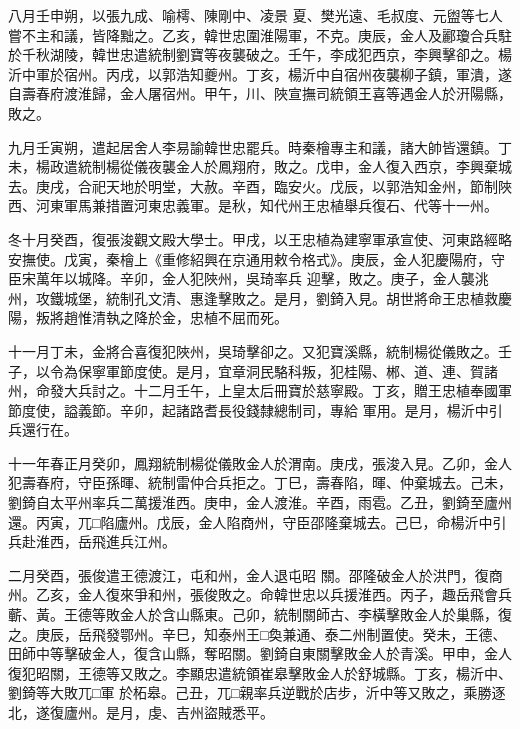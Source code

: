 \begin{pinyinscope}
 八月壬申朔，以張九成、喻樗、陳剛中、凌景
 夏、樊光遠、毛叔度、元盥等七人嘗不主和議，皆降黜之。乙亥，韓世忠圍淮陽軍，不克。庚辰，金人及酈瓊合兵駐於千秋湖陵，韓世忠遣統制劉寶等夜襲破之。壬午，李成犯西京，李興擊卻之。楊沂中軍於宿州。丙戌，以郭浩知夔州。丁亥，楊沂中自宿州夜襲柳子鎮，軍潰，遂自壽春府渡淮歸，金人屠宿州。甲午，川、陜宣撫司統領王喜等遇金人於汧陽縣，敗之。



 九月壬寅朔，遣起居舍人李易諭韓世忠罷兵。時秦檜專主和議，諸大帥皆還鎮。丁
 未，楊政遣統制楊從儀夜襲金人於鳳翔府，敗之。戊申，金人復入西京，李興棄城去。庚戌，合祀天地於明堂，大赦。辛酉，臨安火。戊辰，以郭浩知金州，節制陜西、河東軍馬兼措置河東忠義軍。是秋，知代州王忠植舉兵復石、代等十一州。



 冬十月癸酉，復張浚觀文殿大學士。甲戌，以王忠植為建寧軍承宣使、河東路經略安撫使。戊寅，秦檜上《重修紹興在京通用敕令格式》。庚辰，金人犯慶陽府，守臣宋萬年以城降。辛卯，金人犯陜州，吳琦率兵
 迎擊，敗之。庚子，金人襲洮州，攻鐵城堡，統制孔文清、惠逢擊敗之。是月，劉錡入見。胡世將命王忠植救慶陽，叛將趙惟清執之降於金，忠植不屈而死。



 十一月丁未，金將合喜復犯陜州，吳琦擊卻之。又犯寶溪縣，統制楊從儀敗之。壬子，以令為保寧軍節度使。是月，宜章洞民駱科叛，犯桂陽、郴、道、連、賀諸州，命發大兵討之。十二月壬午，上皇太后冊寶於慈寧殿。丁亥，贈王忠植奉國軍節度使，謚義節。辛卯，起諸路耆長役錢隸總制司，專給
 軍用。是月，楊沂中引兵還行在。



 十一年春正月癸卯，鳳翔統制楊從儀敗金人於渭南。庚戌，張浚入見。乙卯，金人犯壽春府，守臣孫暉、統制雷仲合兵拒之。丁巳，壽春陷，暉、仲棄城去。己未，劉錡自太平州率兵二萬援淮西。庚申，金人渡淮。辛酉，雨雹。乙丑，劉錡至廬州還。丙寅，兀□陷廬州。戊辰，金人陷商州，守臣邵隆棄城去。己巳，命楊沂中引兵赴淮西，岳飛進兵江州。



 二月癸酉，張俊遣王德渡江，屯和州，金人退屯昭
 關。邵隆破金人於洪門，復商州。乙亥，金人復來爭和州，張俊敗之。命韓世忠以兵援淮西。丙子，趣岳飛會兵蘄、黃。王德等敗金人於含山縣東。己卯，統制關師古、李橫擊敗金人於巢縣，復之。庚辰，岳飛發鄂州。辛巳，知泰州王□奐兼通、泰二州制置使。癸未，王德、田師中等擊破金人，復含山縣，奪昭關。劉錡自東關擊敗金人於青溪。甲申，金人復犯昭關，王德等又敗之。李顯忠遣統領崔皋擊敗金人於舒城縣。丁亥，楊沂中、劉錡等大敗兀□軍
 於柘皋。己丑，兀□親率兵逆戰於店步，沂中等又敗之，乘勝逐北，遂復廬州。是月，虔、吉州盜賊悉平。




\end{pinyinscope}

